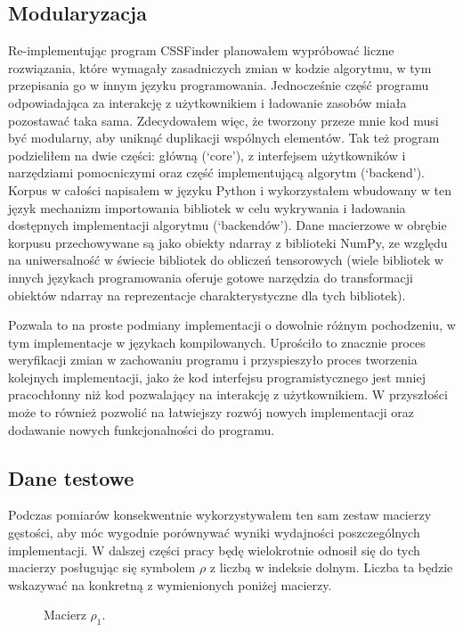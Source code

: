 \documentclass[11pt, a4paper]{article}
\begin{document}
\begin{sloppypar}
    \subsection{Modularyzacja}
    Re-implementując program CSSFinder planowałem wypróbować liczne rozwiązania, które
    wymagały zasadniczych zmian w kodzie algorytmu, w tym przepisania go w innym języku programowania.
    Jednocześnie część programu odpowiadająca za interakcję z użytkownikiem i ładowanie
    zasobów miała pozostawać taka sama. Zdecydowałem więc, że tworzony przeze mnie kod
    musi być modularny, aby uniknąć duplikacji wspólnych elementów. Tak też program
    podzieliłem na dwie części: główną (`core'), z interfejsem użytkowników i
    narzędziami pomocniczymi oraz część implementującą algorytm (`backend'). Korpus w całości
    napisałem w języku Python i wykorzystałem wbudowany w ten język mechanizm importowania
    bibliotek w celu wykrywania i ładowania dostępnych implementacji algorytmu (`backendów').
    Dane macierzowe w obrębie korpusu przechowywane są jako obiekty ndarray z biblioteki
    NumPy, ze względu na uniwersalność w świecie bibliotek do obliczeń tensorowych (wiele
    bibliotek w innych językach programowania oferuje gotowe narzędzia do transformacji
    obiektów ndarray na reprezentacje charakterystyczne dla tych bibliotek).

    Pozwala to na proste podmiany implementacji o dowolnie różnym pochodzeniu, w tym
    implementacje w językach kompilowanych. Uprościło to znacznie proces weryfikacji zmian
    w zachowaniu programu i przyspieszyło proces tworzenia kolejnych implementacji, jako
    że kod interfejsu programistycznego jest mniej pracochłonny niż kod pozwalający na
    interakcję z użytkownikiem. W przyszłości może to również pozwolić na łatwiejszy rozwój
    nowych implementacji oraz dodawanie nowych funkcjonalności do programu.

    \subsection{Dane testowe}
    Podczas pomiarów konsekwentnie wykorzystywałem ten sam zestaw macierzy gęstości, aby
    móc wygodnie porównywać wyniki wydajności poszczególnych implementacji. W dalszej części
    pracy będę wielokrotnie odnosił się do tych macierzy posługując się symbolem $\rho$ z
    liczbą w indeksie dolnym. Liczba ta będzie wskazywać na konkretną z wymienionych
    poniżej macierzy.

    \FloatBarrier
    \begin{figure}[ht]
      \centering
      \setcounter{MaxMatrixCols}{33}
      
      \caption{Macierz $\rho_{1}$.}
      \label{rho-1}
    \end{figure}


\end{sloppypar}
\end{document}
